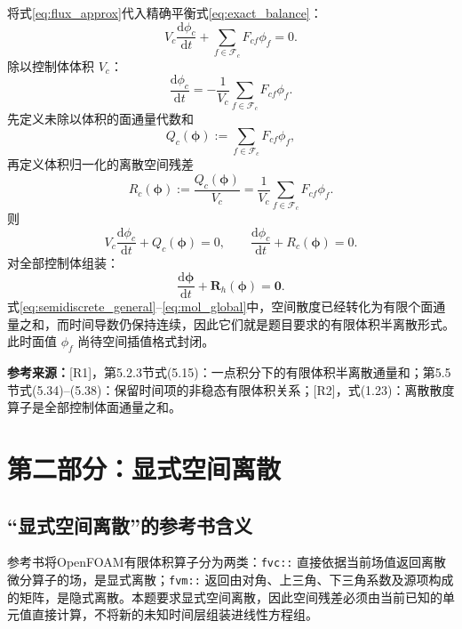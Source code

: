 \documentclass[UTF8,12pt,a4paper]{ctexart}
\numberwithin{equation}{section}
\newcommand{\Rone}{\textnormal{[R1]}}
\newcommand{\Rtwo}{\textnormal{[R2]}}
\newcommand{\source}[1]{%
  \par\smallskip
  \noindent\colorbox{sourcebg}{%
    \parbox{0.955\linewidth}{\footnotesize\color{sourcegray}\textbf{参考来源：}#1}%
  }
  \par\smallskip
}
\newcommand{\phiv}{\bm\phi}
\begin{document}
将式\eqref{eq:flux_approx}代入精确平衡式\eqref{eq:exact_balance}：
\begin{equation}
  V_c\frac{\mathrm d\phi_c}{\mathrm dt}
  +\sum_{f\in\mathcal F_c}F_{cf}\phi_f=0.
  \label{eq:semidiscrete_integral}
\end{equation}
除以控制体体积 $V_c$：
\begin{equation}
  \boxed{
  \frac{\mathrm d\phi_c}{\mathrm dt}
  =-\frac{1}{V_c}\sum_{f\in\mathcal F_c}F_{cf}\phi_f
  }.
  \label{eq:semidiscrete_general}
\end{equation}
先定义未除以体积的面通量代数和
\begin{equation}
  \boxed{
  Q_c(\phiv):=\sum_{f\in\mathcal F_c}F_{cf}\phi_f,}
  \label{eq:flux_sum_general}
\end{equation}
再定义体积归一化的离散空间残差
\begin{equation}
  \boxed{
  R_c(\phiv):=\frac{Q_c(\phiv)}{V_c}
  =\frac{1}{V_c}\sum_{f\in\mathcal F_c}F_{cf}\phi_f.}
  \label{eq:spatial_operator_general}
\end{equation}
则
\begin{equation}
  \boxed{
  V_c\frac{\mathrm d\phi_c}{\mathrm dt}+Q_c(\phiv)=0,
  \qquad
  \frac{\mathrm d\phi_c}{\mathrm dt}+R_c(\phiv)=0
  }.
  \label{eq:mol_cell}
\end{equation}
对全部控制体组装：
\begin{equation}
  \boxed{
  \frac{\mathrm d\phiv}{\mathrm dt}+\bm R_h(\phiv)=\bm0
  }.
  \label{eq:mol_global}
\end{equation}
式\eqref{eq:semidiscrete_general}--\eqref{eq:mol_global}中，空间散度已经转化为有限个面通量之和，而时间导数仍保持连续，因此它们就是题目要求的有限体积半离散形式。此时面值 $\phi_f$ 尚待空间插值格式封闭。

\source{\Rone，第5.2.3节式(5.15)：一点积分下的有限体积半离散通量和；第5.5节式(5.34)--(5.38)：保留时间项的非稳态有限体积关系；\Rtwo，式(1.23)：离散散度算子是全部控制体面通量之和。}

\newpage
\section{第二部分：显式空间离散}

\subsection{“显式空间离散”的参考书含义}

参考书将OpenFOAM有限体积算子分为两类：\texttt{fvc::} 直接依据当前场值返回离散微分算子的场，是显式离散；\texttt{fvm::} 返回由对角、上三角、下三角系数及源项构成的矩阵，是隐式离散。本题要求显式空间离散，因此空间残差必须由当前已知的单元值直接计算，不将新的未知时间层组装进线性方程组。
\end{document}
